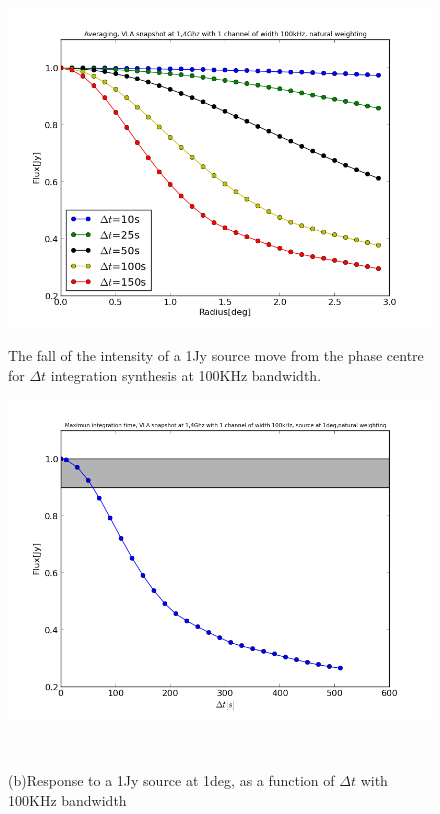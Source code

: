 \documentclass[useAMS,usenatbib]{mn2e}
\begin{document}
\begin{figure}
  \centering
  \begin{minipage}{0.38\linewidth}\includegraphics[width=1\textwidth]{./Figures/effect_time_averaging.png}\caption{The fall of the 
intensity of a 1Jy source move from the phase centre for $\Delta t$ integration synthesis at 100KHz 
bandwidth.}\label{timessear1}\end{minipage}
\begin{minipage}{0.38\linewidth}\includegraphics[width=1\textwidth]{./Figures/maximun_integration.png}\caption{(b)Response to a 1Jy 
source at 1deg, as a function of $\Delta t$ with 100KHz bandwidth}\label{timessear11}\end{minipage}\\

\end{figure}
\end{document}
